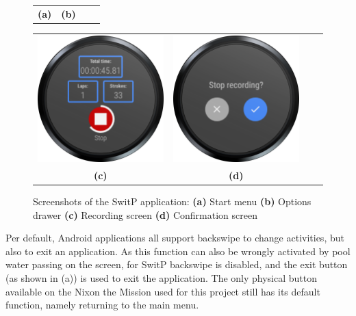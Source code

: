 \documentclass[a4paper, oneside]{discothesis}
\begin{document}
\begin{figure} [H]
\begin{tabular}{cccc}
\textbf{(a)}  & \textbf{(b)} \\[6pt]
\end{tabular}
\begin{tabular}{cccc}
\includegraphics[scale=1.1]{figures/app/record.png} &
\includegraphics[scale=1.1]{figures/app/exitmenu.png} \\
\textbf{(c)}  & \textbf{(d)}  \\[6pt]
\end{tabular}
\caption{Screenshots of the SwitP application:
\textbf{(a)} Start menu
\textbf{(b)} Options drawer
\textbf{(c)} Recording screen
\textbf{(d)} Confirmation screen}
\label{fig:screens}
\end{figure}
Per default, Android applications all support backswipe to change activities, but also to exit an application. As this function can also be wrongly activated by pool water passing on the screen, for SwitP backswipe is disabled, and the exit button (as shown in (a)) is used to exit the application. The only physical button available on the Nixon the Mission used for this project still has its default function, namely returning to the main menu.
\end{document}
